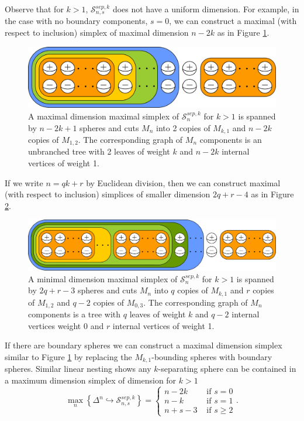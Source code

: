 \documentclass[11pt]{article}
\theoremstyle{remark}
\theoremstyle{definition}
\begin{document}
Observe that for $k>1$,
$\mathcal S^{sep,k}_{n,s}$
does not have a uniform dimension.
For example, in the case with no boundary components, $s=0$,
we can construct
a maximal (with respect to inclusion)
simplex of maximal dimension
\hbox{$n-2k$}
as in Figure \ref{bigsimp}.
\begin{figure}[b!]
\includegraphics[width=\textwidth]{figures/bigsimplex.pdf}
\caption{A maximal dimension maximal simplex of $\mathcal S^{sep,k}_{n}$ for $k>1$
is spanned by $n-2k+1$ spheres and cuts $M_n$ into 2 copies of $M_{k,1}$ and $n-2k$
copies of $M_{1,2}$.
The corresponding graph of $M_{n}$ components is an unbranched tree
with 2 leaves of weight $k$ and $n-2k$ internal vertices of weight 1.}
\label{bigsimp}
\end{figure}
If we write $n=qk+r$ by Euclidean division,
then we can construct maximal (with respect to inclusion) simplices
of smaller dimension $2q+r-4$ as in Figure \ref{lilsimp}.
\begin{figure}[b!]
\includegraphics[width=\textwidth]{figures/smallersimplex.pdf}
\caption{A minimal dimension maximal simplex of $\mathcal S^{sep,k}_{n}$ for $k>1$
is spanned by $2q+r-3$ spheres and cuts $M_n$
into $q$ copies of $M_{k,1}$ and $r$ copies of $M_{1,2}$ and $q-2$ copies of $M_{0,3}$.
The corresponding graph of $M_{n}$ components is a tree
with $q$ leaves of weight $k$ and $q-2$ internal vertices weight 0
and $r$ internal vertices of weight 1.}
\label{lilsimp}
\end{figure}

If there are boundary spheres we can construct a maximal dimension simplex
similar to Figure \ref{bigsimp}
by replacing the $M_{k,1}$-bounding spheres with boundary spheres.
Similar linear nesting shows any $k$-separating sphere can be contained in a maximum dimension simplex
of dimension for $k>1$
$$
\max_n \left \{
\Delta^n \hookrightarrow
\mathcal S^{sep,k}_{n,s}
\right \}
=
\begin{cases}
  n-2k & \mbox{ if } s=0\\
  n-k & \mbox{ if } s=1\\
  n+s-3 & \mbox{ if } s\geq 2
\end{cases}.
$$
\end{document}
